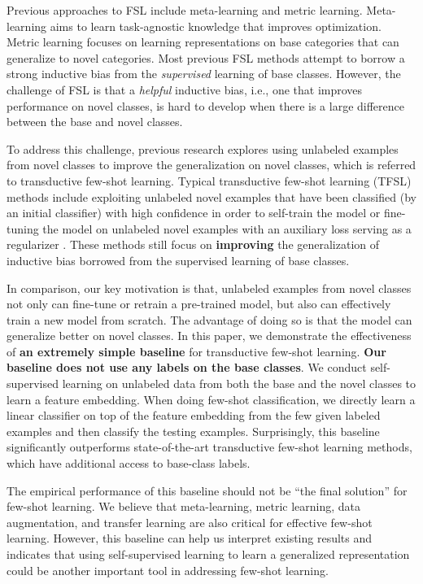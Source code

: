 \documentclass[final]{cvpr}
\begin{document}
Previous approaches to FSL include meta-learning and metric learning. Meta-learning aims to learn task-agnostic knowledge that improves optimization. Metric learning focuses on learning representations on base categories that can generalize to novel categories. Most previous FSL methods attempt to borrow a strong inductive bias from the \textit{supervised} learning of base classes. However, the challenge of FSL is that a {\em helpful} inductive bias, i.e., one that improves performance on novel classes, is hard to develop when there is a large difference between the base and novel classes. 

To address this challenge, previous research explores using unlabeled examples from novel classes to improve the generalization on novel classes, which is referred to transductive few-shot learning. Typical transductive few-shot learning (TFSL) methods include exploiting unlabeled novel examples that have been classified (by an initial classifier) with high confidence in order to self-train the model \cite{liu2018learning,li2019learning,chen2019block} or fine-tuning the model on unlabeled novel examples with an auxiliary loss serving as a regularizer \cite{dhillon2019baseline,rodriguez2020embedding,lichtenstein2020tafssl}. These methods still focus on \textbf{improving} the generalization of inductive bias borrowed from the supervised learning of base classes. 

In comparison, our key motivation is that, unlabeled examples from novel classes not only can fine-tune or retrain a pre-trained model, but also can effectively train a new model from scratch. The advantage of doing so is that the model can generalize better on novel classes.
In this paper, we demonstrate the effectiveness of \textbf{an extremely simple baseline} for transductive few-shot learning.
\textbf{Our baseline does not use any labels on the base classes}. 
{We conduct self-supervised learning on unlabeled data from both the base and the novel classes to learn a feature embedding. When doing few-shot classification, we directly learn a linear classifier on top of the feature embedding from the few given labeled examples and then classify the testing examples.}
Surprisingly, this baseline significantly outperforms state-of-the-art transductive few-shot learning methods, which have additional access to base-class labels. 

The empirical performance of this baseline should not be ``the final solution'' for few-shot learning. We believe that meta-learning, metric learning, data augmentation, and transfer learning are also critical for effective few-shot learning. However, this baseline can help us interpret existing results and indicates that using self-supervised learning to learn a generalized representation could be another important tool in addressing few-shot learning. 
\end{document}
